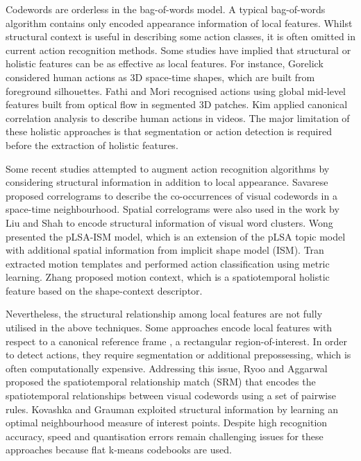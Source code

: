 Codewords are orderless in the bag-of-words model. 
A typical bag-of-words algorithm contains only encoded appearance information of local features.  
Whilst structural context is useful in describing some action classes, it is often omitted in current action recognition methods. Some studies have implied that structural or holistic features can be as effective as local features. 
For instance, Gorelick \etal \cite{Gorelick2007} considered human actions as 3D space-time shapes, which are built from foreground silhouettes. Fathi and Mori \cite{Fathi2008} recognised actions using global mid-level features built from optical flow in segmented 3D patches. Kim \etal \cite{Kim2007} applied canonical correlation analysis to describe human actions in videos. The major limitation of these holistic approaches is that segmentation or action detection is required before the extraction of holistic features.  

Some recent studies attempted to augment action recognition algorithms by considering structural information in addition to local appearance. Savarese \etal \cite{Savarese2008} proposed correlograms to describe the co-occurrences of visual codewords in a space-time neighbourhood. Spatial correlograms were also used in the work by Liu and Shah \cite{Liu2008} to encode structural information of visual word clusters. Wong \etal \cite{Wong2007} presented the pLSA-ISM model, which is an extension of the pLSA topic model \cite{Fergus2005} with additional spatial information from implicit shape model (ISM). Tran \etal \cite{Tran2008} extracted motion templates and performed action classification using metric learning. Zhang \etal \cite{Zhang2008} proposed motion context, which is a spatiotemporal holistic feature based on the shape-context descriptor.  

Nevertheless, the structural relationship among local features are not fully utilised in the above techniques. Some approaches encode local features with respect to a canonical reference frame \cite{Wong2007, Tran2008, Zhang2008}, \eg a rectangular region-of-interest. In order to detect actions, they require segmentation or additional prepossessing, which is often computationally expensive. Addressing this issue, Ryoo and Aggarwal \cite{Ryoo2009} proposed the spatiotemporal relationship match (SRM) that encodes the spatiotemporal relationships between visual codewords using a set of pairwise rules. Kovashka and Grauman \cite{Kovashka2010} exploited structural information by learning an optimal neighbourhood measure of interest points. Despite high recognition accuracy, speed and quantisation errors remain challenging issues for these approaches because flat k-means codebooks are used.   

